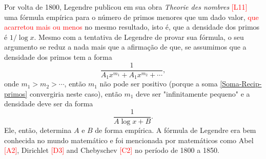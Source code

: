    Por volta de 1800, Legendre publicou em sua obra \textit{Theorie des nombres} \textcolor{red}{[L11]} uma fórmula empírica para o número de primos menores que um dado valor, \textcolor{red}{que acarretou mais ou menos} no mesmo resultado, isto é, que a densidade dos primos é $1/\log x$. Mesmo com a tentativa de Legendre de provar sua fórmula, o seu argumento se reduz a nada mais que a afirmação de que, se assumimos que a densidade dos primos tem a forma
    $$\frac{1}{A_1x^{m_1} + A_1x^{m_2} + \cdots},$$
    onde $m_1 > m_2> \cdots$, então $m_1$ não pode ser positivo (porque a soma \eqref{Soma-Recip-primos} convergiria neste caso), então $m_1$ deve ser "infinitamente pequeno" e a densidade deve ser da forma
    $$\frac{1}{A \log x + B}.$$
    Ele, então, determina $A$ e $B$ de forma empírica. A fórmula de Legendre era bem conhecida no mundo matemático e foi mencionada por matemáticos como Abel \textcolor{red}{[A2]}, Dirichlet \textcolor{red}{[D3]} and Chebyschev \textcolor{red}{[C2]} no período de 1800 a 1850.
    

